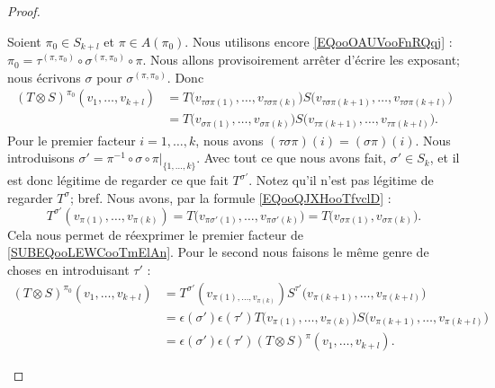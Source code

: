 \begin{proof}
\begin{subproof}
		Soient \( \pi_0\in S_{k+l}\) et \( \pi\in A(\pi_0)\). Nous utilisons encore \eqref{EQooOAUVooFnRQqj} : \( \pi_0=\tau^{(\pi,\pi_0)}\circ\sigma^{(\pi,\pi_0)}\circ\pi\). Nous allons provisoirement arrêter d'écrire les exposant; nous écrivons \( \sigma\) pour \( \sigma^{(\pi,\pi_0)}\). Donc
		\begin{subequations}
			\begin{align}
				(T\otimes S)^{\pi_0}(v_1,\ldots,v_{k+l}) & =T\big(v_{\tau\sigma\pi(1)},\ldots,v_{\tau\sigma\pi(k)}\big)S\big(v_{\tau\sigma\pi(k+1)},\ldots, v_{\tau\sigma\pi(k+l)}\big)               \\
				                                         & = T\big( v_{\sigma\pi(1)},\ldots,v_{\sigma\pi(k)} \big)S\big( v_{\tau\pi(k+1)},\ldots,v_{\tau\pi(k+l)} \big).		\label{SUBEQooLEWCooTmElAn}
			\end{align}
		\end{subequations}
		Pour le premier facteur \( i=1,\ldots,k\), nous avons \( (\tau\sigma\pi)(i)=(\sigma\pi)(i)\). Nous introduisons \( \sigma'=\pi^{-1}\circ\sigma\circ\pi|_{\{ 1,\ldots,k \}}\). Avec tout ce que nous avons fait, \( \sigma'\in S_k\), et il est donc légitime de regarder ce que fait \( T^{\sigma'}\). Notez qu'il n'est pas légitime de regarder \( T^{\sigma}\); bref. Nous avons, par la formule \eqref{EQooQJXHooTfvclD} :
		\begin{equation}
			T^{\sigma'}(v_{\pi(1)},\ldots,v_{\pi(k)})=T\big( v_{\pi\sigma'(1)},\ldots,v_{\pi\sigma'(k)} \big)=T\big( v_{\sigma\pi(1)},v_{\sigma\pi(k)} \big).
		\end{equation}
		Cela nous permet de réexprimer le premier facteur de \eqref{SUBEQooLEWCooTmElAn}. Pour le second nous faisons le même genre de choses en introduisant \( \tau'\) :
		\begin{subequations}		\label{SUBEQSooEMHQooDgCgkp}
			\begin{align}
				(T\otimes S)^{\pi_0}(v_1,\ldots,v_{k+l}) & =T^{\sigma'}(v_{\pi(1),\ldots,v_{\pi(k)}})S^{\tau'}\big( v_{\pi(k+1)},\ldots,v_{\pi(k+l)} \big)                          \\
				                                         & = \epsilon(\sigma')\epsilon(\tau')T\big( v_{\pi(1)},\ldots,v_{\pi(k)} \big)S\big( v_{\pi(k+1)},\ldots,v_{\pi(k+l)} \big) \\
				                                         & = \epsilon(\sigma')\epsilon(\tau')(T\otimes S)^{\pi}(v_1,\ldots,v_{k+l}).
			\end{align}
		\end{subequations}


\end{subproof}
\end{proof}
